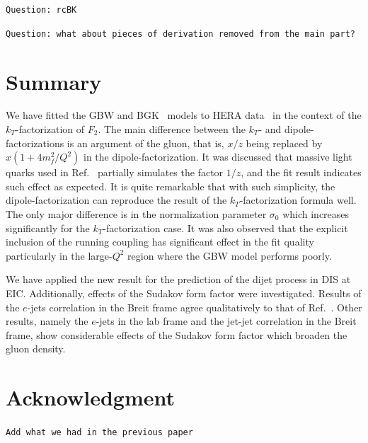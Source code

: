 \documentclass[11pt]{article}
\numberwithin{equation}{section}
\numberwithin{table}{section}
\numberwithin{figure}{section}
\newcommand{\comment}[1]{\texttt{\color{red}#1}}
\begin{document}
\comment{Question: rcBK}

\comment{Question: what about pieces of derivation removed from the main part?}

\section{Summary}
We have fitted the GBW\cite{Golec-Biernat:1998zce}
and BGK~\cite{Bartels:2002cj} models to HERA
data~\cite{Abt:2017nkc} in the context of the $k_T$-factorization of $F_2$.  The
main difference between the $k_T$- and dipole-factorizations is an argument of
the gluon, that is, $x/z$ being replaced by $x(1+4m_f^2/Q^2)$ in the
dipole-factorization. It was discussed that massive light quarks used in
Ref.~\cite{Golec-Biernat:1998zce} partially simulates the factor $1/z$, and the
fit result indicates such effect as expected. It is quite remarkable that with
such simplicity, the dipole-factorization can reproduce the result of the
$k_T$-factorization formula well. The only major difference is in the normalization parameter $\sigma_0$ which increases significantly for the $k_T$-factorization case. It was also observed that the explicit inclusion of the running coupling has significant effect in the fit quality particularly in the large-$Q^2$ region where the GBW model performs poorly. 

We have applied the new result for the prediction of the dijet process in DIS at EIC. Additionally, effects of the Sudakov form factor were investigated. Results of the $e$-jets correlation in the Breit frame agree qualitatively to that of Ref.~\cite{vanHameren:2021sqc}. Other results, namely the $e$-jets in the lab frame and the jet-jet correlation in the Breit frame, show considerable effects of the Sudakov form factor which broaden the gluon density.  


\section*{Acknowledgment}
\comment{Add what we had in the previous paper}



\newpage




%
% 

%
\end{document}
